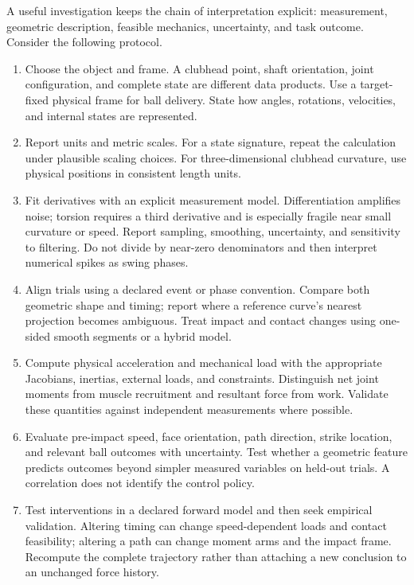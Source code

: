 \documentclass[12pt, openany]{book}
\theoremstyle{plain}
\begin{document}
A useful investigation keeps the chain of interpretation explicit:
measurement, geometric description, feasible mechanics, uncertainty, and
task outcome. Consider the following protocol.

\begin{enumerate}
\item Choose the object and frame. A clubhead point, shaft orientation,
   joint configuration, and complete state are different data products.
   Use a target-fixed physical frame for ball delivery. State how angles,
   rotations, velocities, and internal states are represented.
\item Report units and metric scales. For a state signature, repeat the
   calculation under plausible scaling choices. For three-dimensional
   clubhead curvature, use physical positions in consistent length units.
\item Fit derivatives with an explicit measurement model. Differentiation
   amplifies noise; torsion requires a third derivative and is especially
   fragile near small curvature or speed. Report sampling, smoothing,
   uncertainty, and sensitivity to filtering. Do not divide by near-zero
   denominators and then interpret numerical spikes as swing phases.
\item Align trials using a declared event or phase convention. Compare both
   geometric shape and timing; report where a reference curve's nearest
   projection becomes ambiguous. Treat impact and contact changes using
   one-sided smooth segments or a hybrid model.
\item Compute physical acceleration and mechanical load with the appropriate
   Jacobians, inertias, external loads, and constraints. Distinguish net
   joint moments from muscle recruitment and resultant force from work.
   Validate these quantities against independent measurements where possible.
\item Evaluate pre-impact speed, face orientation, path direction, strike
   location, and relevant ball outcomes with uncertainty. Test whether a
   geometric feature predicts outcomes beyond simpler measured variables
   on held-out trials. A correlation does not identify the control policy.
\item Test interventions in a declared forward model and then seek empirical
   validation. Altering timing can change speed-dependent loads and contact
   feasibility; altering a path can change moment arms and the impact frame.
   Recompute the complete trajectory rather than attaching a new conclusion
   to an unchanged force history.
\end{enumerate}
\end{document}
